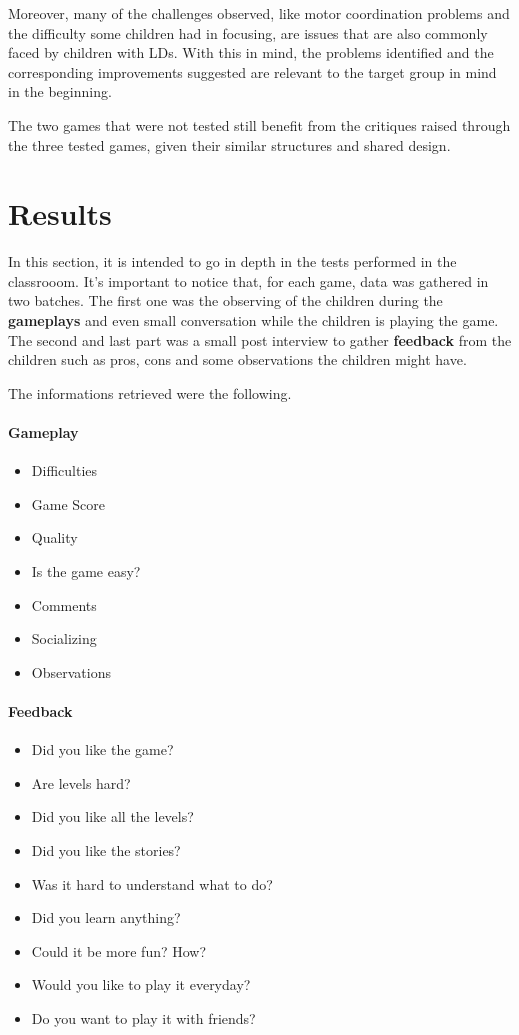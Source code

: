 Moreover, many of the challenges observed, like motor coordination problems and the difficulty some children had in focusing, are issues that are also commonly faced by children with LDs. With this in mind, the problems identified and the corresponding improvements suggested are relevant to the target group in mind in the beginning.

The two games that were not tested still benefit from the critiques raised through the three tested games, given their similar structures and shared design.

\newpage
\section{Results}

In this section, it is intended to go in depth in the tests performed in the classrooom. It's important to notice that, for each game, data was gathered in two batches. The first one was the observing of the children during the \textbf{gameplays} and even small conversation while the children is playing the game. The second and last part was a small post interview to gather \textbf{feedback} from the children such as pros, cons and some observations the children might have.

The informations retrieved were the following.

\paragraph{Gameplay}
\begin{itemize}
    \item Difficulties
    \item Game Score
    \item Quality
    \item Is the game easy?
    \item Comments
    \item Socializing
    \item Observations
\end{itemize}

\paragraph{Feedback}
\begin{itemize}
    \item Did you like the game?
    \item Are levels hard?
    \item Did you like all the levels?
    \item Did you like the stories?
    \item Was it hard to understand what to do?
    \item Did you learn anything?
    \item Could it be more fun? How?
    \item Would you like to play it everyday?
    \item Do you want to play it with friends?
\end{itemize}


